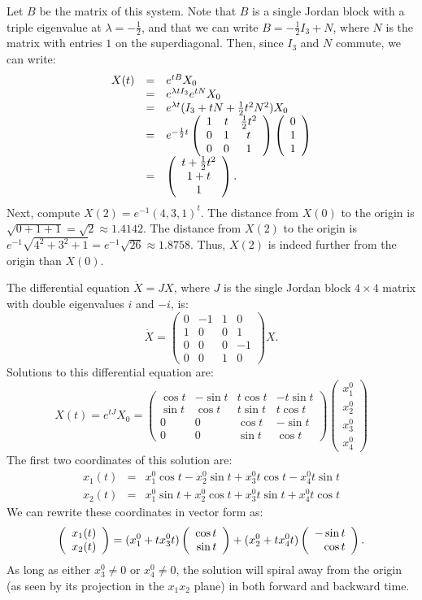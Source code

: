 \documentclass{ximera}
\begin{document}
\soln Let $B$ be the matrix of this system.  Note that $B$ is a single Jordan block
with a triple eigenvalue at $\lambda = -\frac{1}{2}$, and that we can write
$B = -\frac{1}{2}I_3 + N$, where $N$ is the matrix with entries $1$ on the
superdiagonal.  Then, since $I_3$ and $N$ commute, we can write:
\[
\begin{array}{rcl}
X(t) & = & e^{tB}X_0 \\
& = & e^{\lambda tI_3}e^{tN}X_0 \\
& = & e^{\lambda t}(I_3 + tN + \frac{1}{2}t^2N^2)X_0 \\
& = & e^{-\frac{1}{2} t}\left(\begin{array}{ccc} 1 & t & \frac{1}{2}t^2 \\ 0 & 1 & t \\ 0 & 0 & 1\end{array}\right)
\left(\begin{array}{r} 0 \\ 1 \\ 1\end{array}\right) \\
& = & \left(\begin{array}{c} t + \frac{1}{2}t^2 \\ 1 + t \\ 1\end{array}\right).
\end{array}
\]
Next, compute $X(2) = e^{-1}(4,3,1)^t$.
The distance from $X(0)$ to the origin is $\sqrt{0 + 1 + 1} = \sqrt{2}
\approx 1.4142$.  The distance from $X(2)$ to the origin is
$e^{-1}\sqrt{4^2 + 3^2 + 1} = e^{-1}\sqrt{26} \approx 1.8758$.
Thus, $X(2)$ is indeed further from the origin than $X(0)$.

  The differential equation $\dot{X}=JX$, where $J$ is the 
single Jordan block $4\times 4$ matrix with double eigenvalues $i$ and $-i$,
is:
\[
\dot{X} = \left(\begin{array}{rr|rr}
 0 & -1 & 1 &  0 \\
 1 &  0 & 0 &  1 \\
\hline
 0 &  0 & 0 & -1\\
 0 &  0 & 1 &  0
\end{array}\right)X.  
\]
Solutions to this differential equation are:
\[
X(t) = e^{tJ}X_0 = \left(\begin{array}{rrrr}
  \cos t & -\sin t & t\cos t & -t\sin t\\
  \sin t &  \cos t & t\sin t &  t\cos t\\
     0   &    0    &  \cos t &  -\sin t\\
     0   &    0    &  \sin t &   \cos t  
\end{array}\right)
\left(\begin{array}{r} x_1^0 \\  x_2^0 \\ x_3^0 \\ x_4^0 \end{array}\right)
\]
The first two coordinates of this solution are:
\begin{eqnarray*}
x_1(t) & = & x_1^0\cos t - x_2^0\sin t + x_3^0t\cos t - x_4^0t\sin t\\
x_2(t) & = & x_1^0\sin t + x_2^0\cos t + x_3^0t\sin t + x_4^0t\cos t
\end{eqnarray*}
We can rewrite these coordinates in vector form as:
\[
\left(\begin{array}{r} x_1(t) \\ x_2(t)\end{array}\right) =
(x_1^0 + tx_3^0t)\left(\begin{array}{r} \cos t \\ \sin t\end{array}\right) + 
(x_2^0 + tx_4^0t)\left(\begin{array}{r} -\sin t \\ \cos t\end{array}\right).
\] 
As long as either $x_3^0\neq 0$ or $x_4^0\neq 0$, the solution will spiral 
away from the origin (as seen by its projection in the $x_1x_2$ plane) in 
both forward and backward time.
\end{document}
